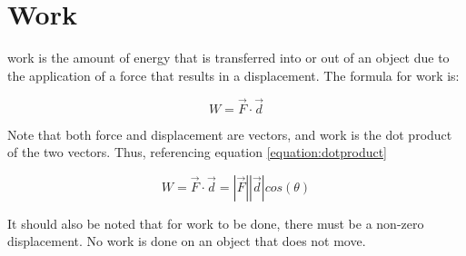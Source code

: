 	
	
	
	\section{Work} 
\gls{work} is the amount of energy that is transferred into or out of an object due to the application of a force that results in a displacement.  The formula for work is:

\begin{mdframed}[backgroundcolor=orange!20!white]
	\begin{equation}
		W = \vec{F}\cdot\vec{d}  
		\label{eqn:work}
	\end{equation}
\end{mdframed}

Note that both force and displacement are vectors, and work is the dot product of the two vectors.  Thus, referencing equation \ref{equation:dotproduct}
\begin{mdframed}[backgroundcolor=orange!20!white]
	\begin{equation}
		W = \vec{F}\cdot\vec{d}  = |\vec{F}| |\vec{d}| cos (\theta)
		\label{eqn:workdotproduct}
	\end{equation}
\end{mdframed}	
It should also be noted that for work to be done, there must be a non-zero displacement.  No work is done on an object that does not move.  




